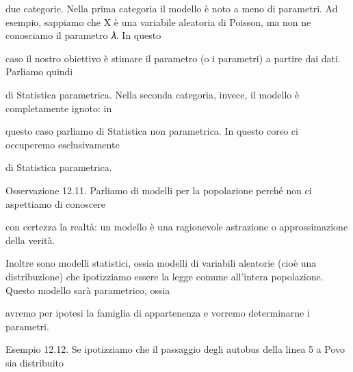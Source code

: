 \documentclass[a4paper,portrait,12pt]{article}
\begin{document}
\begin{flushleft}
due categorie. Nella prima categoria il modello \`{e} noto a meno di parametri. Ad esempio, sappiamo che X \`{e} una variabile aleatoria di Poisson, ma non ne conosciamo il parametro 𝜆. In questo
\end{flushleft}


\begin{flushleft}
caso il nostro obiettivo \`{e} stimare il parametro (o i parametri) a partire dai dati. Parliamo quindi
\end{flushleft}


\begin{flushleft}
di Statistica parametrica. Nella seconda categoria, invece, il modello \`{e} completamente ignoto: in
\end{flushleft}


\begin{flushleft}
questo caso parliamo di Statistica non parametrica. In questo corso ci occuperemo esclusivamente
\end{flushleft}


\begin{flushleft}
di Statistica parametrica.
\end{flushleft}


\begin{flushleft}
Osservazione 12.11. Parliamo di modelli per la popolazione perch\'{e} non ci aspettiamo di conoscere
\end{flushleft}


\begin{flushleft}
con certezza la realt\`{a}: un modello \`{e} una ragionevole astrazione o approssimazione della verit\`{a}.
\end{flushleft}


\begin{flushleft}
Inoltre sono modelli statistici, ossia modelli di variabili aleatorie (cio\`{e} una distribuzione) che ipotizziamo essere la legge comune all'intera popolazione. Questo modello sar\`{a} parametrico, ossia
\end{flushleft}


\begin{flushleft}
avremo per ipotesi la famiglia di appartenenza e vorremo determinarne i parametri.
\end{flushleft}


\begin{flushleft}
Esempio 12.12. Se ipotizziamo che il passaggio degli autobus della linea 5 a Povo sia distribuito
\end{flushleft}
\end{document}
